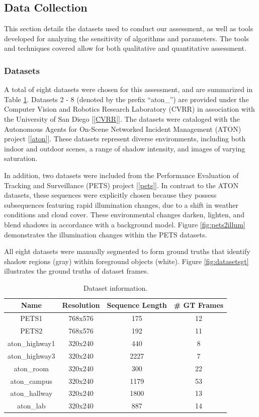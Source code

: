 \subsection{Data Collection}  \label{section:datacollection}

This section details the datasets used to conduct our assessment, as well as tools developed for analyzing the sensitivity of algorithms and parameters. The tools and techniques covered allow for both qualitative and quantitative assessment.

\subsubsection{Datasets}

A total of eight datasets were chosen for this assessment, and are summarized in Table \ref{table:datasets}. Datasets 2 - 8 (denoted by the prefix ``aton\_'') are provided under the Computer Vision and Robotics Research Laboratory (CVRR) in association with the University of San Diego [\ref{CVRR}]. The datasets were cataloged with the Autonomous Agents for On-Scene Networked Incident Management (ATON) project [\ref{aton}]. These datasets represent diverse environments, including both indoor and outdoor scenes, a range of shadow intensity, and images of varying saturation.

In addition, two datasets were included from the Performance Evaluation of Tracking and Surveillance (PETS) project [\ref{pets}]. In contrast to the ATON datasets, these sequences were explicitly chosen because they possess subsequences featuring rapid illumination changes, due to a shift in weather conditions and cloud cover. These environmental changes darken, lighten, and blend shadows in accordance with a background model. Figure \ref{fig:pets2illum} demonstrates the illumination changes within the PETS datasets.

All eight datasets were manually segmented to form ground truths that identify shadow regions (gray) within foreground objects (white). Figure \ref{fig:datasetsgt} illustrates the ground truths of dataset frames.


\begin{table}
\centering
\begin{tabular}{ |c|c|c|c| }
	\hline
	\textbf{Name} & \textbf{Resolution} & \textbf{Sequence Length} & \textbf{\# GT Frames} \\
	\hline
	\hline
	PETS1 & 768x576 & 175 & 12 \\
	\hline
	PETS2 & 768x576 & 192 & 11 \\
	\hline
	aton\_highway1 & 320x240 & 440 & 8 \\
	\hline 
	aton\_highway3 & 320x240 & 2227 & 7 \\ 
	\hline
	aton\_room & 320x240 & 300 & 22 \\ 
	\hline
	aton\_campus & 320x240 & 1179 & 53 \\ 
	\hline
	aton\_hallway & 320x240 & 1800 & 13 \\
	\hline
	aton\_lab & 320x240 & 887 & 14 \\ 
	\hline
\end{tabular}
\caption{Dataset information.}
\label{table:datasets}
\end{table}

